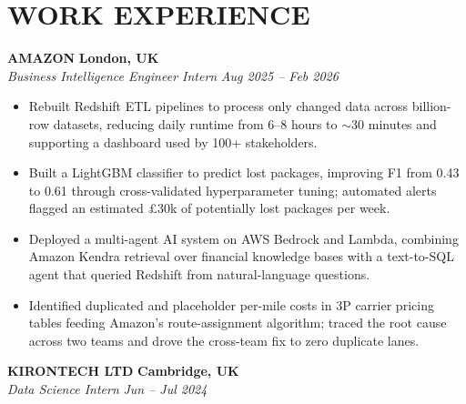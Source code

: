 \documentclass[10pt,a4paper]{article}
\begin{document}

\section*{WORK EXPERIENCE}

\textbf{AMAZON} \hfill \textbf{London, UK}\\
\textit{Business Intelligence Engineer Intern} \hfill \textit{Aug 2025 -- Feb 2026}

\begin{itemize}
    \item Rebuilt Redshift ETL pipelines to process only changed data across billion-row datasets, reducing daily runtime from 6--8 hours to $\sim$30 minutes and supporting a dashboard used by 100+ stakeholders.

    \item Built a LightGBM classifier to predict lost packages, improving F1 from 0.43 to 0.61 through cross-validated hyperparameter tuning; automated alerts flagged an estimated \pounds{}30k of potentially lost packages per week.

    \item Deployed a multi-agent AI system on AWS Bedrock and Lambda, combining Amazon Kendra retrieval over financial knowledge bases with a text-to-SQL agent that queried Redshift from natural-language questions.

    \item Identified duplicated and placeholder per-mile costs in 3P carrier pricing tables feeding Amazon's route-assignment algorithm; traced the root cause across two teams and drove the cross-team fix to zero duplicate lanes.
\end{itemize}

\textbf{KIRONTECH LTD} \hfill \textbf{Cambridge, UK}\\
\textit{Data Science Intern} \hfill \textit{Jun -- Jul 2024}
\end{document}
